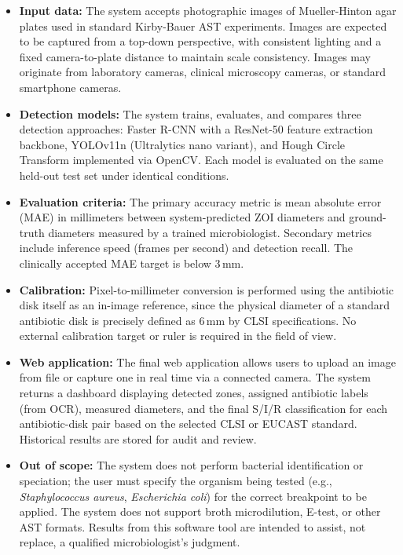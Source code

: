 \begin{itemize}
  \item \textbf{Input data:} The system accepts photographic images of Mueller-Hinton agar plates
        used in standard Kirby-Bauer AST experiments. Images are expected to be captured from a
        top-down perspective, with consistent lighting and a fixed camera-to-plate distance to
        maintain scale consistency. Images may originate from laboratory cameras, clinical
        microscopy cameras, or standard smartphone cameras.

  \item \textbf{Detection models:} The system trains, evaluates, and compares three detection
        approaches: Faster R-CNN with a ResNet-50 feature extraction backbone, YOLOv11n
        (Ultralytics nano variant), and Hough Circle Transform implemented via OpenCV. Each
        model is evaluated on the same held-out test set under identical conditions.

  \item \textbf{Evaluation criteria:} The primary accuracy metric is mean absolute error (MAE)
        in millimeters between system-predicted ZOI diameters and ground-truth diameters measured
        by a trained microbiologist. Secondary metrics include inference speed (frames per second)
        and detection recall. The clinically accepted MAE target is below 3\,mm.

  \item \textbf{Calibration:} Pixel-to-millimeter conversion is performed using the antibiotic
        disk itself as an in-image reference, since the physical diameter of a standard antibiotic
        disk is precisely defined as 6\,mm by CLSI specifications. No external calibration target
        or ruler is required in the field of view.

  \item \textbf{Web application:} The final web application allows users to upload an image from
        file or capture one in real time via a connected camera. The system returns a dashboard
        displaying detected zones, assigned antibiotic labels (from OCR), measured diameters, and
        the final S/I/R classification for each antibiotic-disk pair based on the selected
        CLSI or EUCAST standard. Historical results are stored for audit and review.

  \item \textbf{Out of scope:} The system does not perform bacterial identification or speciation;
        the user must specify the organism being tested (e.g., \textit{Staphylococcus aureus},
        \textit{Escherichia coli}) for the correct breakpoint to be applied. The system does not
        support broth microdilution, E-test, or other AST formats. Results from this software
        tool are intended to assist, not replace, a qualified microbiologist's judgment.
\end{itemize}

